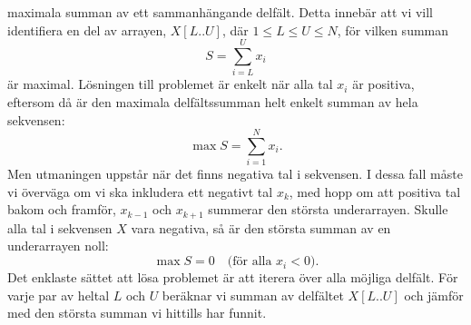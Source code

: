 \documentclass[a4paper,12pt]{article} \usepackage[swedish]{babel}
\begin{document}
        maximala summan av ett sammanhängande delfält. Detta innebär att vi
        vill identifiera en del av arrayen, $X[L..U]$, där $1 \leq L \leq U
        \leq N$, för vilken summan \begin{displaymath} S = \sum_{i=L}^{U}
        x_i \end{displaymath} är maximal. Lösningen till problemet är
        enkelt när alla tal $x_i$ är positiva, eftersom då är den maximala
        delfältssumman helt enkelt summan av hela sekvensen:
        \begin{displaymath} \max S = \sum_{i=1}^{N} x_i. \end{displaymath}
            Men utmaningen uppstår när det finns negativa tal i sekvensen.
            I dessa fall måste vi överväga om vi ska inkludera ett negativt
            tal $x_k$, med hopp om att positiva tal bakom och framför,
            $x_{k-1}$ och $x_{k+1}$ summerar den största underarrayen.
            Skulle alla tal i sekvensen $X$ vara negativa, så är den
            största summan av en underarrayen noll: \begin{displaymath}
                \max S = 0 \quad \text{(för alla } x_i < 0\text{)}.
            \end{displaymath} Det enklaste sättet att lösa problemet är att
            iterera över alla möjliga delfält. För varje par av heltal $L$
            och $U$ beräknar vi summan av delfältet $X[L..U]$ och jämför
            med den största summan vi hittills har funnit.
\end{document}
